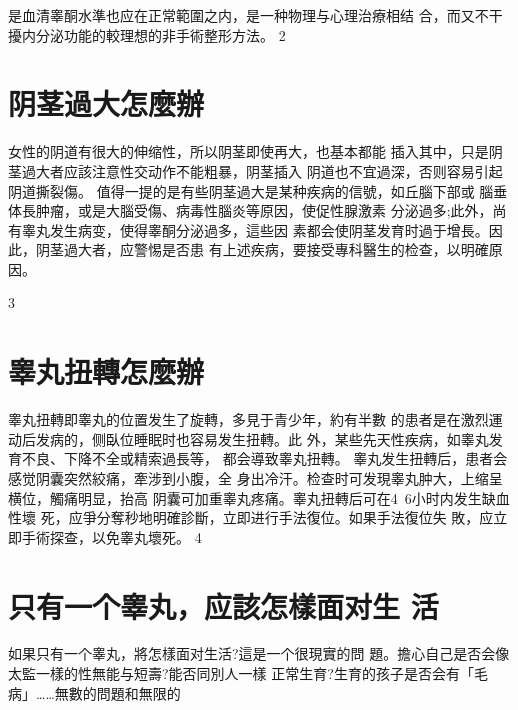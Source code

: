 \documentclass[12pt,UTF8]{ctexbook}
\begin{document}
是血清睾酮水準也应在正常範圍之内，是一种物理与心理治療相结
合，而又不干擾内分泌功能的較理想的非手術整形方法。
2
\section{阴茎過大怎麼辦}
女性的阴道有很大的伸缩性，所以阴茎即使再大，也基本都能
插入其中，只是阴茎過大者应該注意性交动作不能粗暴，阴茎插入
阴道也不宜過深，否则容易引起阴道撕裂傷。
值得一提的是有些阴茎過大是某种疾病的信號，如丘腦下部或
腦垂体長肿瘤，或是大腦受傷、病毒性腦炎等原因，使促性腺激素
分泌過多;此外，尚有睾丸发生病变，使得睾酮分泌過多，這些因
素都会使阴茎发育时過于增長。因此，阴茎過大者，应警惕是否患
有上述疾病，要接受專科醫生的检查，以明確原因。

3
\section{睾丸扭轉怎麼辦}
睾丸扭轉即睾丸的位置发生了旋轉，多見于青少年，約有半數
的患者是在激烈運动后发病的，侧臥位睡眠时也容易发生扭轉。此
外，某些先天性疾病，如睾丸发育不良、下降不全或精索過長等，
都会導致睾丸扭轉。
睾丸发生扭轉后，患者会感觉阴囊突然絞痛，牽涉到小腹，全
身出冷汗。检查时可发現睾丸肿大，上缩呈横位，觸痛明显，抬高
阴囊可加重睾丸疼痛。睾丸扭轉后可在4~6小时内发生缺血性壞
死，应爭分奪秒地明確診斷，立即进行手法復位。如果手法復位失
敗，应立即手術探查，以免睾丸壞死。
4
\section{只有一个睾丸，应該怎樣面对生
活}
如果只有一个睾丸，將怎樣面对生活?這是一个很現實的問
題。擔心自己是否会像太監一樣的性無能与短壽?能否同別人一樣
正常生育?生育的孩子是否会有「毛病」……無數的問題和無限的
\end{document}
